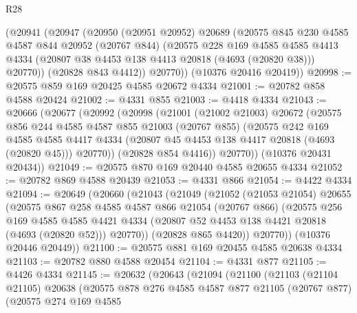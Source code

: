\begin{lexlean}{R28}
\begin{coremodule}
      (@20941
        (@20947
          (@20950
            (@20951 @20952)
            @20689
            (@20575
              @845
              @230
              @4585
              @4587
              @844
              @20952
              (@20767 @844)
              (@20575
                @228
                @169
                @4585
                @4585
                @4413
                @4334
                (@20807 @38 @4453 @138 @4413 @20818 (@4693 (@20820 @38)))
                @20770))
            (@20828 @843 @4412))
          @20770))
      (@10376 @20416 @20419))
@20998 := @20575 @859 @169 @20425 @4585 @20672 @4334
@21001 := @20782 @858 @4588 @20424
@21002 := @4331 @855
@21003 := @4418 @4334
@21043 := @20666
    (@20677
      (@20992
        (@20998
          (@21001
            (@21002 @21003)
            @20672
            (@20575
              @856
              @244
              @4585
              @4587
              @855
              @21003
              (@20767 @855)
              (@20575
                @242
                @169
                @4585
                @4585
                @4417
                @4334
                (@20807 @45 @4453 @138 @4417 @20818 (@4693 (@20820 @45)))
                @20770))
            (@20828 @854 @4416))
          @20770))
      (@10376 @20431 @20434))
@21049 := @20575 @870 @169 @20440 @4585 @20655 @4334
@21052 := @20782 @869 @4588 @20439
@21053 := @4331 @866
@21054 := @4422 @4334
@21094 := @20649
    (@20660
      (@21043
        (@21049
          (@21052
            (@21053 @21054)
            @20655
            (@20575
              @867
              @258
              @4585
              @4587
              @866
              @21054
              (@20767 @866)
              (@20575
                @256
                @169
                @4585
                @4585
                @4421
                @4334
                (@20807 @52 @4453 @138 @4421 @20818 (@4693 (@20820 @52)))
                @20770))
            (@20828 @865 @4420))
          @20770))
      (@10376 @20446 @20449))
@21100 := @20575 @881 @169 @20455 @4585 @20638 @4334
@21103 := @20782 @880 @4588 @20454
@21104 := @4331 @877
@21105 := @4426 @4334
@21145 := @20632
    (@20643
      (@21094
        (@21100
          (@21103
            (@21104 @21105)
            @20638
            (@20575
              @878
              @276
              @4585
              @4587
              @877
              @21105
              (@20767 @877)
              (@20575
                @274
                @169
                @4585

\end{coremodule}
\end{lexlean}
